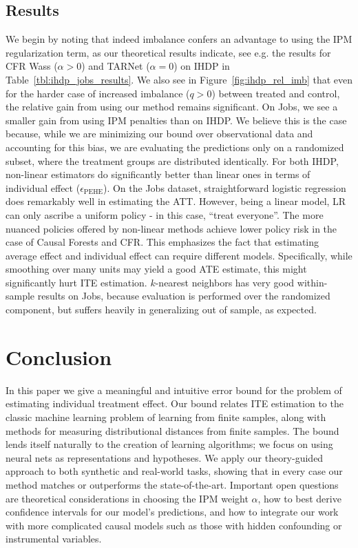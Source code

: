 \documentclass{article}
\def \epehe{\epsilon_{\text{PEHE}}}
\def\tarnet{{TARNet}}
\begin{document}
\subsection{Results}
We begin by noting that indeed imbalance confers an advantage to using the IPM regularization term, as our theoretical results indicate, see e.g. the results for CFR Wass ($\alpha > 0$) and \tarnet{} ($\alpha = 0$) on IHDP in Table~\ref{tbl:ihdp_jobs_results}. We also see in Figure~\ref{fig:ihdp_rel_imb} that even for the harder case of increased imbalance ($q>0$) between treated and control, the relative gain from using our method remains significant. On Jobs, we see a smaller gain from using IPM penalties than on IHDP. We believe this is the case because, while we are minimizing our bound over observational data and accounting for this bias, we are evaluating the predictions only on a randomized subset, where the treatment groups are distributed identically.
For both IHDP, non-linear estimators do significantly better than linear ones in terms of individual effect ($\epehe$). On the Jobs dataset, straightforward logistic regression does remarkably well in estimating the ATT. However, being a linear model, LR can only ascribe a uniform policy - in this case, ``treat everyone''. The more nuanced policies offered by non-linear methods achieve lower policy risk in the case of Causal Forests and CFR. This emphasizes the fact that estimating average effect and individual effect can require different models. Specifically, while smoothing over many units may yield a good ATE estimate, this might significantly hurt ITE estimation. $k$-nearest neighbors has very good within-sample results on Jobs, because evaluation is performed over the randomized component, but suffers heavily in generalizing out of sample, as expected.




 
\vskip -10pt
\section{Conclusion}
In this paper we give a meaningful and intuitive error bound for the problem of estimating individual treatment effect. Our bound relates ITE estimation to the classic machine learning problem of learning from finite samples, along with methods for measuring distributional distances from finite samples. The bound lends itself naturally to the creation of learning algorithms; we focus on using neural nets as representations and hypotheses. We apply our theory-guided approach to both synthetic and real-world tasks, showing that in every case our method matches or outperforms the state-of-the-art. Important open questions are theoretical considerations in choosing the IPM weight $\alpha$, how to best derive confidence intervals for our model's predictions, and how to integrate our work with more complicated causal models such as those with hidden confounding or instrumental variables. 
\end{document}

